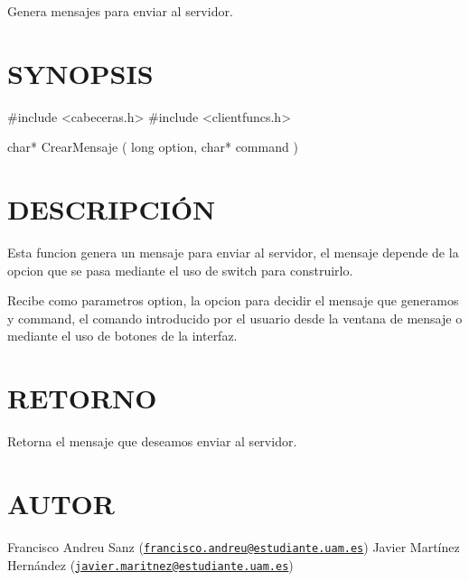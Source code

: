Genera mensajes para enviar al servidor.\hypertarget{ServerReply_SYNOPSIS}{}\section{S\-Y\-N\-O\-P\-S\-I\-S}\label{ServerReply_SYNOPSIS}
\begin{DoxyVerb} #include  <cabeceras.h>
   #include  <clientfuncs.h>

 char* CrearMensaje ( long option, char*  command  )
\end{DoxyVerb}
\hypertarget{ServerReply_descripcion}{}\section{D\-E\-S\-C\-R\-I\-P\-C\-IÓ\-N}\label{ServerReply_descripcion}
Esta funcion genera un mensaje para enviar al servidor, el mensaje depende de la opcion que se pasa mediante el uso de switch para construirlo.

Recibe como parametros option, la opcion para decidir el mensaje que generamos y command, el comando introducido por el usuario desde la ventana de mensaje o mediante el uso de botones de la interfaz.\hypertarget{ServerReply_retorno}{}\section{R\-E\-T\-O\-R\-N\-O}\label{ServerReply_retorno}
Retorna el mensaje que deseamos enviar al servidor.\hypertarget{ServerReply_authors}{}\section{A\-U\-T\-O\-R}\label{ServerReply_authors}
Francisco Andreu Sanz (\href{mailto:francisco.andreu@estudiante.uam.es}{\tt francisco.\-andreu@estudiante.\-uam.\-es}) Javier Martínez Hernández (\href{mailto:javier.maritnez@estudiante.uam.es}{\tt javier.\-maritnez@estudiante.\-uam.\-es}) 

 